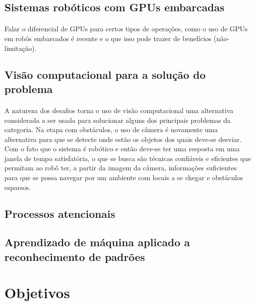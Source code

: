 \documentclass[11pt]{report}
\begin{document}
\subsection{Sistemas robóticos com GPUs embarcadas}
\paragraph{}
Falar o diferencial de GPUs para certos tipos de operações,
como o uso de GPUs em robôs embarcados é recente e o que isso pode trazer de
benefícios (não-limitação).

\subsection{Visão computacional para a solução do problema}
\paragraph{}
A natureza dos desafios torna o uso de visão computacional uma alternativa
considerada a ser usada para solucionar alguns dos principais problemas
da categoria. 
Na etapa com obstáculos, o uso de câmera é novamente uma alternativa para 
que se detecte onde estão os objetos dos quais deve-se desviar.
Com o fato que o sistema é robótico e então deve-se ter uma resposta em uma 
janela de tempo satisfatória, o que se busca são técnicas confiáveis e 
eficientes que permitam ao robô ter, a partir da imagem da câmera, informações
suficientes para que se possa navegar por um ambiente com locais a 
se chegar e obstáculos esparsos.

\subsection{Processos atencionais}
\paragraph{}

\subsection{Aprendizado de máquina aplicado a reconhecimento de padrões}
\paragraph{}

\section{Objetivos}
\end{document}
